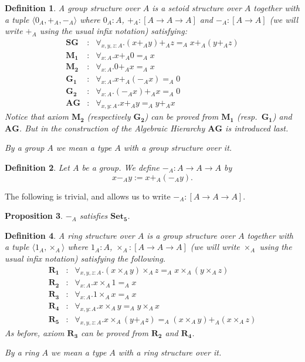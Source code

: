 \documentclass{article}
\newtheorem{definition}{Definition}[section]
\newtheorem{proposition}[definition]{Proposition}
\newcommand{\axiom}[1]{\ensuremath{\mathbf{#1}}}
\begin{document}
\begin{definition}
A \emph{group structure} over $A$ is a setoid structure over $A$ together
with a tuple $\langle 0_A,+_A,-_A\rangle$ where $0_A:A$, $+_A:[A\to
A\to A]$ and $-_A:[A\to A]$ (we will write $+_A$ using the usual infix
notation) satisfying:
\begin{eqnarray*}
\axiom{SG} & : & \forall_{x,y,z:A}.(x+_A y)+_A z=_A x+_A(y+_A z) \\
\axiom{M_1} & : & \forall_{x:A}.x+_A 0=_A x\\
\axiom{M_2} & : & \forall_{x:A}.0+_A x=_A x\\
\axiom{G_1} & : & \forall_{x:A}.x+_A (-_A x)=_A 0\\
\axiom{G_2} & : & \forall_{x:A}.(-_A x)+_A x=_A 0\\
\axiom{AG} & : & \forall_{x,y:A}.x+_A y=_A y+_A x
\end{eqnarray*}
Notice that axiom \axiom{M_2} (respectively \axiom{G_2}) can be proved
from \axiom{M_1} (resp.\ \axiom{G_1}) and \axiom{AG}.  But in the construction
of the Algebraic Hierarchy \axiom{AG} is introduced last.

By a group $A$ we mean a type $A$ with a group structure over it.
\end{definition}

\begin{definition} Let $A$ be a group.  We define $-_A:A\to A\to A$ by
\[x-_A y:= x+_A(-_A y).\]
\end{definition}

The following is trivial, and allows us to write $-_A:[A\to A\to A]$.

\begin{proposition} $-_A$ satisfies \axiom{Set_5}.
\end{proposition}

\begin{definition}
A \emph{ring structure} over $A$ is a group structure over $A$ together with
a tuple $\langle 1_A,\times_A\rangle$ where $1_A:A$, $\times_A:[A\to
A\to A]$ (we will write $\times_A$ using the usual infix notation)
satisfying the following.
\begin{eqnarray*}
\axiom{R_1} & : & \forall_{x,y,z:A}.
 (x\times_A y)\times_A z=_A x\times_A(y\times_A z) \\
\axiom{R_2} & : & \forall_{x:A}.x\times_A 1=_A x\\
\axiom{R_3} & : & \forall_{x:A}.1\times_A x=_A x\\
\axiom{R_4} & : & \forall_{x,y:A}.x\times_A y=_A y\times_A x\\
\axiom{R_5} & : & \forall_{x,y,z:A}.
 x\times_A(y+_A z)=_A(x\times_A y)+_A(x\times_A z)
\end{eqnarray*}
As before, axiom \axiom{R_3} can be proved from \axiom{R_2} and
\axiom{R_4}.

By a ring $A$ we mean a type $A$ with a ring structure over it.
\end{definition}
\end{document}
